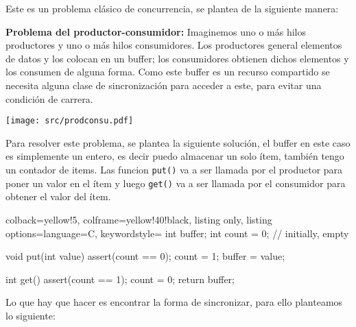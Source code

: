 \documentclass[openany]{book}
\begin{document}
Este es un problema clásico de concurrencia, se plantea de la siguiente manera:

\begin{tcolorbox}
    \textbf{Problema del productor-consumidor:} 
    \tcblower
    Imaginemos uno o más hilos productores y uno o más hilos consumidores. Los productores general elementos de datos y los colocan en un buffer; los consumidores obtienen dichos elementos y los consumen de alguna forma. Como este buffer es un recurso compartido se necesita alguna clase de sincronización para acceder a este, para evitar una condición de carrera.
    \begin{center}
        \texttt{[image: src/prodconsu.pdf]}    
    \end{center}
\end{tcolorbox}

Para resolver este problema, se plantea la siguiente solución, el buffer en este caso es simplemente un entero, es decir puedo almacenar un solo ítem, también tengo un contador de items. Las funcion \texttt{put()} va a ser llamada por el productor para poner un valor en el ítem y luego \texttt{get()} va a ser llamada por el consumidor para obtener el valor del ítem.

\begin{tcblisting}{colback=yellow!5, colframe=yellow!40!black, listing only, listing options={language=C, keywordstyle=\color{blue!35!white}\bfseries}}
int buffer;
int count = 0; // initially, empty
    
void put(int value) {
    assert(count == 0);
    count = 1;
    buffer = value;
}
    
int get() {
    assert(count == 1);
    count = 0;
    return buffer;
}
\end{tcblisting}

Lo que hay que hacer es encontrar la forma de sincronizar, para ello planteamos lo siguiente:
\end{document}
